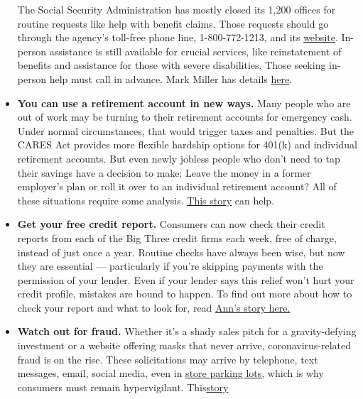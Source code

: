 \begin{itemize}
  The Social Security Administration has mostly closed its 1,200 offices
  for routine requests like help with benefit claims. Those requests
  should go through the agency's toll-free phone line, 1-800-772-1213,
  and its \href{https://www.ssa.gov/onlineservices/}{website}. In-person
  assistance is still available for crucial services, like reinstatement
  of benefits and assistance for those with severe disabilities. Those
  seeking in-person help must call in advance. Mark Miller has details
  \href{https://www.nytimes3xbfgragh.onion/2020/03/17/business/retirement/coronavirus-social-security.html}{here}.
\item
  \textbf{You can use a retirement account in new ways.} Many people who
  are out of work may be turning to their retirement accounts for
  emergency cash. Under normal circumstances, that would trigger taxes
  and penalties. But the CARES Act provides more flexible hardship
  options for 401(k) and individual retirement accounts. But even newly
  jobless people who don't need to tap their savings have a decision to
  make: Leave the money in a former employer's plan or roll it over to
  an individual retirement account? All of these situations require some
  analysis.
  \href{https://www.nytimes3xbfgragh.onion/2020/05/10/business/401k-rollover-faq.html}{This
  story} can help.
\item
  \textbf{Get your free credit report.} Consumers can now check their
  credit reports from each of the Big Three credit firms each week, free
  of charge, instead of just once a year. Routine checks have always
  been wise, but now they are essential --- particularly if you're
  skipping payments with the permission of your lender. Even if your
  lender says this relief won't hurt your credit profile, mistakes are
  bound to happen. To find out more about how to check your report and
  what to look for, read
  \href{https://www.nytimes3xbfgragh.onion/2020/05/15/your-money/coronavirus-credit-reports.html}{Ann's
  story here.}
\item
  \textbf{Watch out for fraud.} Whether it's a shady sales pitch for a
  gravity-defying investment or a website offering masks that never
  arrive, coronavirus-related fraud is on the rise. These solicitations
  may arrive by telephone, text messages, email, social media, even in
  \href{https://www.nytimes3xbfgragh.onion/2020/04/05/us/politics/coronavirus-scams-fraud-price-gouging.html}{store
  parking lots,} which is why consumers must remain hypervigilant.
  This\href{https://www.nytimes3xbfgragh.onion/2020/03/13/business/coronavirus-scams.html}{story
}
\end{itemize}
